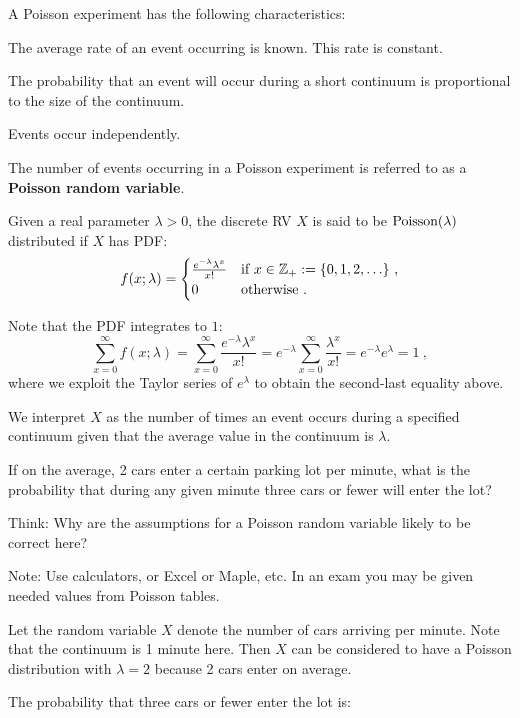 A Poisson experiment has the following characteristics:

\bit
\item The average  rate of an event occurring is known. This rate is constant.
\item  The probability that an event  will occur during a short continuum is proportional to the size of the continuum.
\item  Events occur independently.
\eit

The number of events occurring  in a Poisson experiment is referred to as a
{\bf Poisson random variable}.

\begin{model}\label{M:Poisson}
Given a real parameter $\lambda>0$, the discrete RV $X$ is said to be $\mbox{{\rm Poisson}}(\lambda)$ distributed if $X$ has PDF:
\begin{equation}\label{E:Poissonpdf}
f(x;\lambda) =
\begin{cases}
 \frac{ e^{-\lambda} \lambda^x}{x!} & \text{if $x \in \mathbb{Z}_+ := \{0,1,2,\ldots\}$} \ , \\
0 & \text{otherwise} \ .
\end{cases}
\end{equation}

Note that the PDF integrates to $1$:
\[
\sum_{x=0}^{\infty} f(x;\lambda)
= \sum_{x=0}^{\infty}  \frac{ e^{-\lambda} \lambda^x}{x!}
=  e^{-\lambda} \sum_{x=0}^{\infty}  \frac{\lambda^x}{x!}
=  e^{-\lambda} e^{\lambda}
= 1 \ ,
\]
where we exploit the Taylor series of $e^{\lambda}$ to obtain the second-last equality above.

We interpret $X$ as the number of times an event occurs during a
specified continuum given that the average value in the continuum is
$\lambda$. 
\end{model}


\begin{example}{\label{eqn:poi_cars}}
If on the average, 2 cars enter a certain parking lot per minute,
  what is the probability that during any given minute three cars or
  fewer
  will enter the lot?

Think: Why are the assumptions for a Poisson random variable likely to
be correct here?

Note: Use calculators, or Excel or Maple, etc. In an exam you may be given needed values from Poisson tables.


Let the random variable $X$ denote the number of cars
  arriving per minute. Note that the continuum is 1 minute here. Then  $X$ can be considered to have  a Poisson distribution
  with $\lambda=2$ because 2 cars enter on
average.

\medskip

The probability that three cars or fewer enter the lot is:
\end{example}


